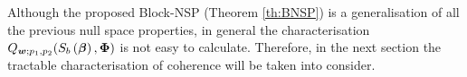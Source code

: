\begin{remark}
\label{rmrk:BNSP-intractable} 
Although the proposed Block-NSP (Theorem \ref{th:BNSP}) is a generalisation of all the previous null space properties, in general the characterisation $Q_{\boldsymbol{w};p_1,p_2}(S_b\left( \boldsymbol{\beta} \right),\boldsymbol{\Phi})$ is not easy to calculate.
Therefore, in the next section the tractable characterisation of coherence will be taken into consider.
\end{remark}